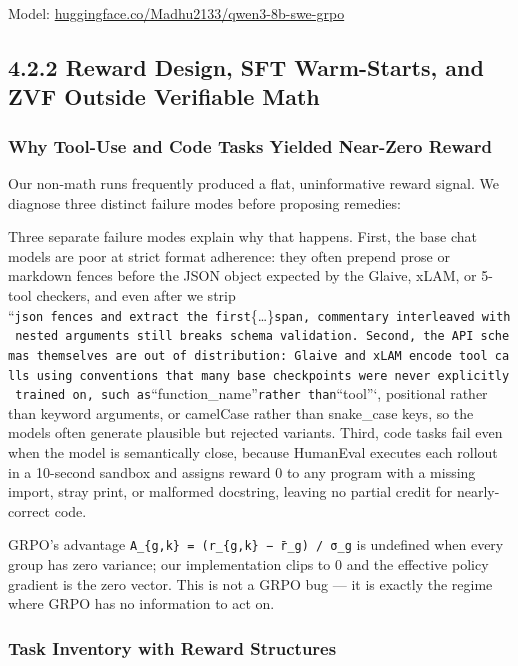 \documentclass[
  american,
  11pt,
  a4paper,
  oneside]{report}
\begin{document}
Model:
\href{https://huggingface.co/Madhu2133/qwen3-8b-swe-grpo}{huggingface.co/Madhu2133/qwen3-8b-swe-grpo}

\subsection{4.2.2 Reward Design, SFT Warm-Starts, and ZVF Outside
Verifiable
Math}\label{reward-design-sft-warm-starts-and-zvf-outside-verifiable-math}

\subsubsection{Why Tool-Use and Code Tasks Yielded Near-Zero
Reward}\label{why-tool-use-and-code-tasks-yielded-near-zero-reward}

Our non-math runs frequently produced a flat, uninformative reward
signal. We diagnose three distinct failure modes before proposing
remedies:

Three separate failure modes explain why that happens. First, the base
chat models are poor at strict format adherence: they often prepend
prose or markdown fences before the JSON object expected by the Glaive,
xLAM, or 5-tool checkers, and even after we strip
``\texttt{json\ fences\ and\ extract\ the\ first}\{\ldots\}\texttt{span,\ commentary\ interleaved\ with\ nested\ arguments\ still\ breaks\ schema\ validation.\ Second,\ the\ API\ schemas\ themselves\ are\ out\ of\ distribution:\ Glaive\ and\ xLAM\ encode\ tool\ calls\ using\ conventions\ that\ many\ base\ checkpoints\ were\ never\ explicitly\ trained\ on,\ such\ as}``function\_name''\texttt{rather\ than}``tool''`,
positional rather than keyword arguments, or camelCase rather than
snake\_case keys, so the models often generate plausible but rejected
variants. Third, code tasks fail even when the model is semantically
close, because HumanEval executes each rollout in a 10-second sandbox
and assigns reward 0 to any program with a missing import, stray print,
or malformed docstring, leaving no partial credit for nearly-correct
code.

GRPO's advantage \texttt{A\_\{g,k\}\ =\ (r\_\{g,k\}\ −\ r̄\_g)\ /\ σ\_g}
is undefined when every group has zero variance; our implementation
clips to 0 and the effective policy gradient is the zero vector. This is
not a GRPO bug --- it is exactly the regime where GRPO has no
information to act on.

\subsubsection{Task Inventory with Reward
Structures}\label{task-inventory-with-reward-structures}
\end{document}
